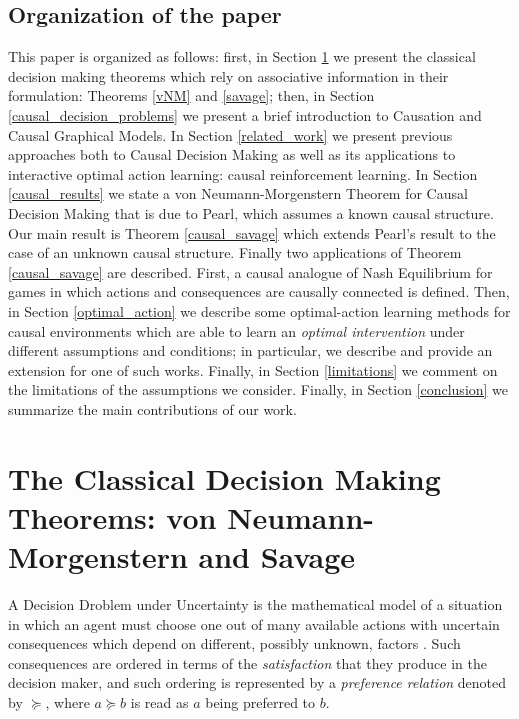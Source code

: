 \documentclass{svjour3}                     %
\begin{document}
\subsection{Organization of the paper}
\label{organization}
This paper is organized as follows: first, in Section \ref{classical_theorems} we present the classical decision making theorems which rely on associative information in their formulation: Theorems \ref{vNM} and \ref{savage}; then, in Section \ref{causal_decision_problems} we present a brief introduction to Causation and Causal Graphical Models. In Section \ref{related_work} we present previous approaches both to Causal Decision Making as well as its applications to interactive optimal action learning: causal reinforcement learning. In Section \ref{causal_results} we state a von Neumann-Morgenstern Theorem for Causal Decision Making that is due to Pearl, which assumes a known causal structure. Our main result is Theorem \ref{causal_savage} which extends Pearl's result to the case of an unknown causal structure. Finally two applications of Theorem \ref{causal_savage} are described. First, a causal analogue of Nash Equilibrium for games in which actions and consequences are causally connected is defined. Then, in Section \ref{optimal_action} we describe some optimal-action learning methods for causal environments which are able to learn an \textit{optimal intervention} under different assumptions and conditions; in particular, we describe and provide an extension for one of such works. Finally, in Section \ref{limitations} we comment on the limitations of the assumptions we consider. Finally, in Section \ref{conclusion} we summarize the main contributions of our work.

\section{The Classical Decision Making Theorems: von Neumann-Morgenstern and Savage}
\label{classical_theorems}
A Decision Droblem under Uncertainty is the mathematical model of a situation in which an agent must choose one out of many available actions with uncertain consequences which depend on different, possibly unknown, factors \citep{bernardo2000bayesian,gilboa2009decision}. Such consequences are ordered in terms of the \textit{satisfaction} that they produce in the decision maker, and such ordering is represented by a \textit{preference relation} denoted by $\succeq$, where $a \succeq b$ is read as $a$ being preferred to $b$.
\end{document}
